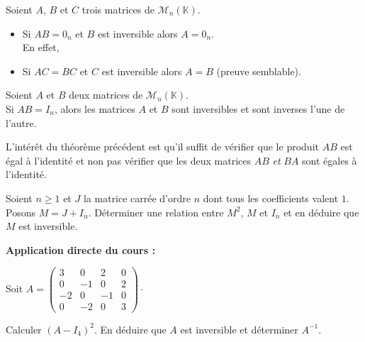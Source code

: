 \documentclass[french,11pt,twoside]{VcCours}
\newenvironment{ApplicationDirecte}{\textbf{Application directe du cours :}

}{}
\begin{document}
\begin{Remarque}{}
 Soient $A$, $B$ et $C$ trois matrices de $\mathcal{M}_n(\mathbb{K})$.
\begin{itemize}
\item Si $AB=0_n$ et $B$ est inversible alors $A=0_n$.\\
En effet, 
\item Si $AC=BC$ et $C$ est inversible alors $A=B$ (preuve semblable).
\end{itemize}
\end{Remarque}

\medskip

\begin{Theoreme}{}
Soient $A$ et $B$ deux matrices de $\mathcal{M}_n(\mathbb{K})$.\\
Si $AB=I_n$, alors les matrices $A$ et $B$ sont inversibles et sont inverses l'une de l'autre.
\end{Theoreme}

\begin{Remarque}{} 
L'intérêt du théorème précédent est qu'il suffit de vérifier que le produit $AB$ est égal à l'identité et non pas vérifier que les deux matrices $AB$ \emph{et} $BA$ sont égales à l'identité.
\end{Remarque}

\begin{Exemple} Soient $n \geq 1$ et $J$ la matrice carrée d'ordre $n$ dont tous les coefficients valent $1$. Posons $M=J+ I_n$. Déterminer une relation entre $M^2$, $M$ et $I_n$ et en déduire que $M$ est inversible.

        \newpage
\vspace*{3cm}
\end{Exemple}

\medskip

\begin{ApplicationDirecte}
Soit $A=\begin{pmatrix}
3& 0 & 2 & 0\\
0 & -1 & 0 & 2\\
-2 & 0& -1 & 0\\
0 & -2 & 0 & 3
\end{pmatrix} \cdot$

Calculer $(A-I_4)^2$. En déduire que $A$ est inversible et déterminer $A^{-1}$. 
%
\end{ApplicationDirecte}
\end{document}
